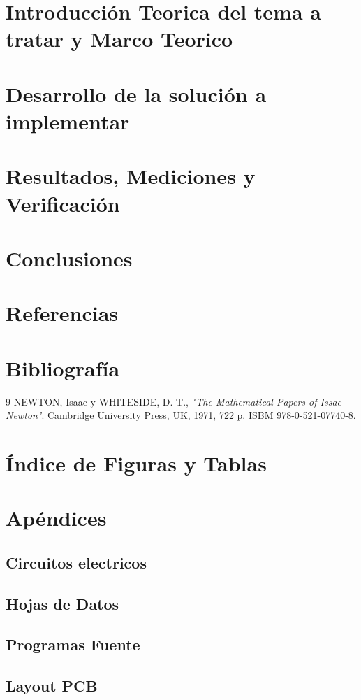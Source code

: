 \documentclass[a4paper,10pt]{article}
\begin{document}
\newpage
\section{Introducción Teorica del tema a tratar y Marco Teorico}
\label{sec:2_marcoteorico}

\newpage
\section{Desarrollo de la solución a implementar}
\label{sec:3_solucion}

\newpage
\section{Resultados, Mediciones y Verificación}
\label{sec:4_resmedver}

\newpage
\section{Conclusiones}
\label{sec:5_concl}

\newpage
\section{Referencias}
\label{sec:6_refs}

\newpage
\section{Bibliografía}
\label{sec:7_biblio}

\begin{thebibliography}{9}
	NEWTON, Isaac y WHITESIDE, D. T.,
    \textit{"The Mathematical Papers of Issac Newton"}.
    Cambridge University Press,
    UK,
    1971,
    722 p.
    ISBM 978-0-521-07740-8.  
\end{thebibliography}

\newpage
\section{Índice de Figuras y Tablas}
\label{sec:7b_indice}

\listoffigures
\listoftables

\newpage
\section{Apéndices}
\label{sec:8_apendix}

\subsection{Circuitos electricos}
\label{sec:9_circ}

\subsection{Hojas de Datos}
\label{sec:10_hd}

\subsection{Programas Fuente}
\label{sec:11_soft}

\subsection{Layout PCB}
\label{sec:12_pcblay}
\end{document}
